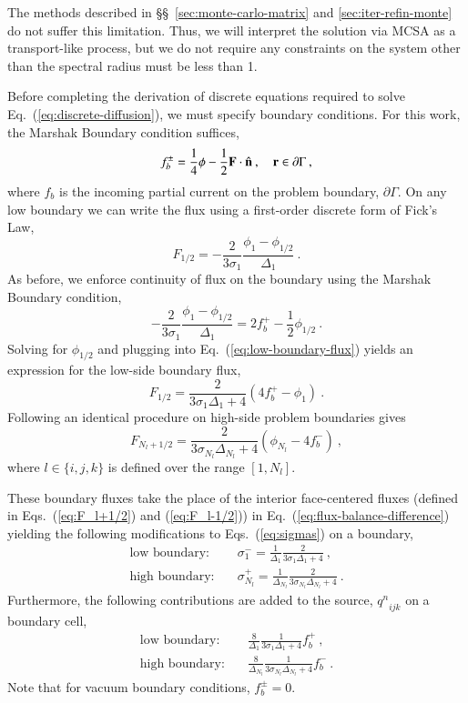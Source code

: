 \documentclass[preprint,12pt]{elsarticle}
\newcommand{\vr}{\ensuremath{\ve{r}}}
\newcommand{\qn}{\ensuremath{q^n}}
\begin{document}
The methods described in \S\S~\ref{sec:monte-carlo-matrix} and
\ref{sec:iter-refin-monte} do not suffer this limitation.  Thus, we
will interpret the solution via MCSA as a transport-like process, but
we do not require any constraints on the system other than the
spectral radius must be less than 1. 

Before completing the derivation of discrete equations required to
solve Eq.~(\ref{eq:discrete-diffusion}), we must specify boundary
conditions.  For this work, the Marshak Boundary condition suffices,
\begin{equation}
  f_b^\pm = \frac{1}{4}\phi - \frac{1}{2}\ve{F}\cdot\hat{\ve{n}}\:,\quad
  \vr\in \partial\Gamma\:,
\end{equation}
where $f_b$ is the incoming partial current on the problem boundary,
$\partial\Gamma$.  On any low boundary we can write the flux using a
first-order discrete form of Fick's Law,
\begin{equation}
  F_{1/2} = -\frac{2}{3\sigma_1}\frac{\phi_1 - \phi_{1/2}}{\Delta_1}\:.
  \label{eq:low-boundary-flux}
\end{equation}
As before, we enforce continuity of flux on the boundary using the
Marshak Boundary condition,
\begin{equation}
  -\frac{2}{3\sigma_1}\frac{\phi_1 - \phi_{1/2}}{\Delta_1} = 2f_b^{+}
  -\frac{1}{2}\phi_{1/2}\:. 
\end{equation}
Solving for $\phi_{1/2}$ and plugging into
Eq.~(\ref{eq:low-boundary-flux}) yields an expression for the low-side
boundary flux,
\begin{equation}
  F_{1/2} = \frac{2}{3\sigma_1\Delta_1 + 4}(4f_b^{+}-\phi_1)\:.
\end{equation}
Following an identical procedure on high-side problem boundaries gives
\begin{equation}
  F_{N_l+1/2} = \frac{2}{3\sigma_{N_l}\Delta_{N_l} +
    4}(\phi_{N_l}-4f_b^{-})\:, 
\end{equation}
where $l\in\{i,j,k\}$ is defined over the range $[1,N_l]$.

These boundary fluxes take the place of the interior face-centered
fluxes (defined in Eqs.~(\ref{eq:F_l+1/2}) and (\ref{eq:F_l-1/2})) in
Eq.~(\ref{eq:flux-balance-difference}) yielding the following
modifications to Eqs.~(\ref{eq:sigmas}) on a boundary,
\begin{align}
  \text{low boundary:}\quad & \sigma_1^{-} = \frac{1}{\Delta_1}
  \frac{2}{3\sigma_1\Delta_1 + 4}\:,\\
  \text{high boundary:}\quad & \sigma_{N_l}^{+} = \frac{1}{\Delta_{N_l}}
  \frac{2}{3\sigma_{N_l}\Delta_{N_l} + 4}\:.
\end{align}
Furthermore, the following contributions are added to the source,
$\qn_{ijk}$ on a boundary cell,
\begin{align}
  \text{low boundary:}\quad & \frac{8}{\Delta_1}
  \frac{1}{3\sigma_1\Delta_1 + 4}f_b^{+}\:,\\
  \text{high boundary:}\quad & \frac{8}{\Delta_{N_l}}
  \frac{1}{3\sigma_{N_l}\Delta_{N_l} + 4}f_b^{-}\:.
\end{align}
Note that for vacuum boundary conditions, $f_b^{\pm} = 0$.
\end{document}
